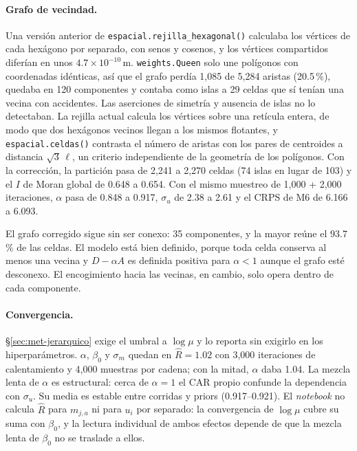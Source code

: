 \paragraph{Grafo de vecindad.} Una versión anterior de
\texttt{espacial.\allowbreak rejilla\_\allowbreak hexagonal()} calculaba los vértices de cada hexágono
por separado, con senos y cosenos, y los vértices compartidos diferían en unos
$4.7\times10^{-10}$\,m. \texttt{weights.Queen} solo une polígonos con
coordenadas idénticas, así que el grafo perdía 1,085 de 5,284 aristas
(20.5\,\%), quedaba en 120 componentes y contaba como islas a 29 celdas que sí
tenían una vecina con accidentes. Las aserciones de simetría y ausencia de
islas no lo detectaban. La rejilla actual calcula los vértices sobre una
retícula entera, de modo que dos hexágonos vecinos llegan a los mismos
flotantes, y \texttt{espacial.celdas()} contrasta el número de aristas con los
pares de centroides a distancia $\sqrt{3}\,\ell$, un criterio independiente de
la geometría de los polígonos. Con la corrección, la partición pasa de 2,241 a
2,270 celdas (74 islas en lugar de 103) y el $I$ de Moran global de 0.648 a
0.654. Con el mismo muestreo de 1,000 + 2,000 iteraciones, $\alpha$ pasa de
0.848 a 0.917, $\sigma_u$ de 2.38 a 2.61 y el CRPS de M6 de 6.166 a 6.093.

El grafo corregido sigue sin ser conexo: 35 componentes, y la mayor reúne el
93.7\,\% de las celdas. El modelo está bien definido, porque toda celda
conserva al menos una vecina y $D - \alpha A$ es definida positiva para
$\alpha < 1$ aunque el grafo esté desconexo. El encogimiento hacia las vecinas,
en cambio, solo opera dentro de cada componente.

\paragraph{Convergencia.} §\ref{sec:met-jerarquico} exige el umbral a
$\log\mu$ y lo reporta sin exigirlo en los hiperparámetros. $\alpha$,
$\beta_0$ y $\sigma_m$ quedan en $\hat{R} = 1.02$ con 3,000 iteraciones de
calentamiento y 4,000 muestras por cadena; con la mitad, $\alpha$ daba 1.04.
La mezcla lenta de $\alpha$ es estructural: cerca de $\alpha = 1$ el CAR propio
confunde la dependencia con $\sigma_u$. Su media es estable entre corridas y
priors (0.917--0.921). El \emph{notebook} no calcula $\hat{R}$ para $m_{j,a}$
ni para $u_i$ por separado: la convergencia de $\log\mu$ cubre su suma con
$\beta_0$, y la lectura individual de ambos efectos depende de que la mezcla
lenta de $\beta_0$ no se traslade a ellos.

